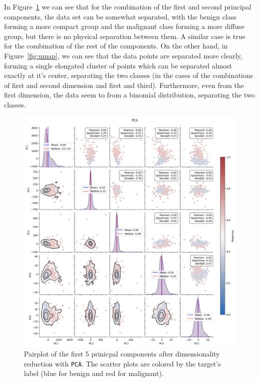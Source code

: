 \documentclass[12pt]{article}
\begin{document}
In Figure~\ref{fig:pca} we can see that for the combination of the first and
second principal components, the data set can be somewhat separated, with the
benign class forming a more compact group and the malignant class forming a more
diffuse group, but there is no physical separation between them. A similar
case is true for the combination of the rest of the components. On the other
hand, in Figure~\ref{fig:umap}, we can see that the data points are separated
more clearly, forming a single elongated cluster of points which can be
separated almost exactly at it's center, separating the two classes (in the
cases of the combinations of first and second dimension and first and third).
Furthermore, even from the first dimension, the data seem to from a binomial
distribution, separating the two classes.

\begin{figure}[H]
    \centering
    \includegraphics[width=\textwidth]{ims/pca.png}
    \caption{Pairplot of the first 5 prinicpal components after dimensionality
    reduction with \texttt{PCA}. The scatter plots are colored by the target's
    label (blue for benign and red for malignant).}
    \label{fig:pca}
\end{figure}
\end{document}
